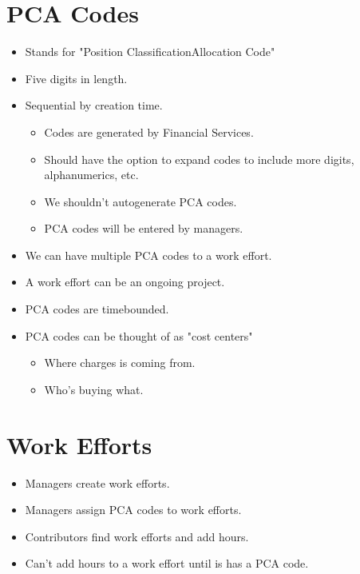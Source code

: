 \documentclass{article}
\begin{document}
\section{PCA Codes}
\begin{itemize}
\item Stands for "Position ClassificationAllocation Code"
\item Five digits in length.
\item Sequential by creation time.
	\begin{itemize}
	\item Codes are generated by Financial Services.
	\item Should have the option to expand codes to include more digits, alphanumerics, etc.
	\item We shouldn't autogenerate PCA codes.
	\item PCA codes will be entered by managers.
	\end{itemize}
\item We can have multiple PCA codes to a work effort.
\item A work effort can be an ongoing project.
\item PCA codes are timebounded.
\item PCA codes can be thought  of as "cost centers"
	\begin{itemize}
	\item Where charges is coming from.
	\item Who's buying what.
	\end{itemize}
\end{itemize}
\section{Work Efforts}
\begin{itemize}
\item Managers create work efforts.
\item Managers assign PCA codes to work efforts.
\item Contributors find work efforts and add hours.
\item Can't add hours to a work effort until is has a PCA code.
\end{itemize}
\end{document}
